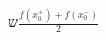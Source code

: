 \documentclass[preview]{standalone}
\begin{document}
\begin{center}
$\displaystyle{ש\frac{f(x_0^+)+f(x_0^-)}{2}}$
\end{center}
\end{document}

